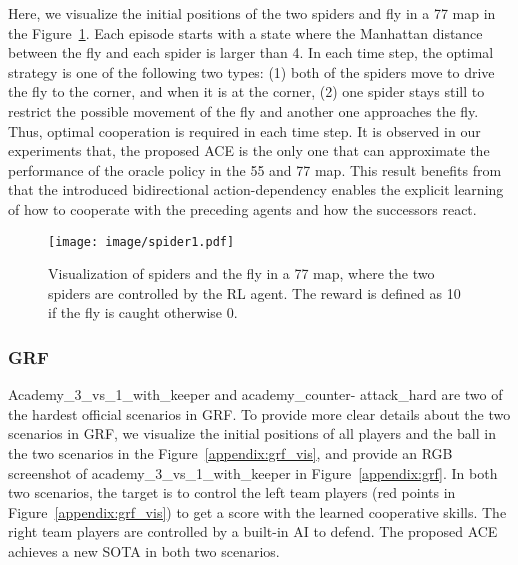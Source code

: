\documentclass[letterpaper]{article} \usepackage{aaai23}  \usepackage{times}  \usepackage{helvet}  \usepackage{courier}  \usepackage[hyphens]{url}  \usepackage{graphicx} \urlstyle{rm} \def\UrlFont{\rm}  \usepackage{natbib}  \usepackage{caption} \frenchspacing  \setlength{\pdfpagewidth}{8.5in} \setlength{\pdfpageheight}{11in} \usepackage{algorithm}
\begin{document}
Here, we visualize the initial positions of the two spiders and fly in a 77 map in the Figure~\ref{appendix:spides-fly}. Each episode starts with a state where the Manhattan distance between the fly and each spider is larger than 4. In each time step, the optimal strategy is one of the following two types: (1) both of the spiders move to drive the fly to the corner, and when it is at the corner, (2) one spider stays still to restrict the possible movement of the fly and another one approaches the fly. Thus, optimal cooperation is required in each time step. It is observed in our experiments that, the proposed ACE is the only one that can approximate the performance of the oracle policy in the 55 and 77 map. This result benefits from that the introduced bidirectional action-dependency enables the explicit learning of how to cooperate with the preceding agents and how the successors react.

\begin{figure}[h]
    \centering
    \texttt{[image: image/spider1.pdf]}
\vspace{-0.2cm}
    \caption{Visualization of spiders and the fly in a 77 map, where the two spiders are controlled by the RL agent. The reward is defined as 10 if the fly is caught otherwise 0.
}
\vspace{-3ex}
    \label{appendix:spides-fly}
\end{figure}

\subsubsection{GRF}
Academy\_3\_vs\_1\_with\_keeper and academy\_counter-
attack\_hard are two of the hardest official scenarios in GRF. To provide more clear details about the two scenarios in GRF, we visualize the initial positions of all players and the ball in the two scenarios in the Figure~\ref{appendix:grf_vis}, and provide an RGB screenshot of academy\_3\_vs\_1\_with\_keeper in Figure~\ref{appendix:grf}. In both two scenarios, the target is to control the left team players (red points in Figure~\ref{appendix:grf_vis}) to get a score with the learned cooperative skills. The right team players are controlled by a built-in AI to defend. The proposed ACE achieves a new SOTA in both two scenarios.
\end{document}
